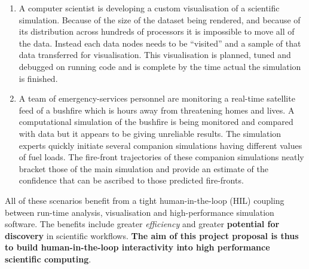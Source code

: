 \documentclass[a4paper,fontsize=12pt]{scrartcl}
\begin{document}
\begin{enumerate}
\item A computer scientist is developing a custom visualisation of a
  scientific simulation. Because of the size of the dataset being
  rendered, and because of its distribution across hundreds of
  processors it is impossible to move all of the data. Instead each
  data nodes needs to be ``visited'' and a sample of that data
  transferred for visualisation. This visualisation is planned, tuned
  and debugged on running code and is complete by the time actual the
  simulation is finished.



\item A team of emergency-services personnel are monitoring a
  real-time satellite feed of a bushfire which is hours away from
  threatening homes and lives. A computational simulation of the
  bushfire is being monitored and compared with data but it appears to
  be giving unreliable results. The simulation experts quickly
  initiate several companion simulations having different values of
  fuel loads. The fire-front trajectories of these companion
  simulations neatly bracket those of the main simulation and provide
  an estimate of the confidence that can be ascribed to those
  predicted fire-fronts.


\end{enumerate}

All of these scenarios benefit from a tight human-in-the-loop (HIL)
coupling between run-time analysis, visualisation and high-performance
simulation software. The benefits include greater \emph{efficiency}
and greater \textbf{potential for discovery} in scientific workflows.
\textbf{The aim of this project proposal is thus to build
  human-in-the-loop interactivity into high performance scientific
  computing}.
\end{document}

